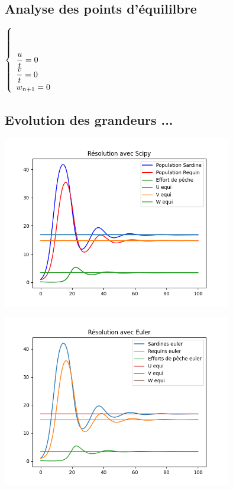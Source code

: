\documentclass[a4paper, 11pt]{report}%
\begin{document}
        \subsection{Analyse des points d'équililbre}
        $ \left\{
            \begin{array}[t]{l}
                \dfrac{u}{t} =0 \\
                \dfrac{v}{t} = 0\\
                w_{n+1} = 0
            \end{array}
        \right.$
        
        \subsection{Evolution des grandeurs ...}
        \begin{center}
            \includegraphics[width=10cm]{figures/Scipy_good_conditions.png}
        \end{center}

        \begin{center}
            \includegraphics[width=10cm]{figures/Euler_good_conditions.png}
        \end{center}
\end{document}
